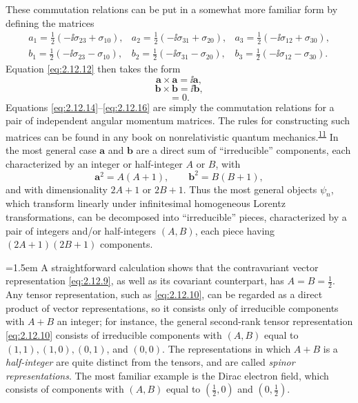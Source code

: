 These commutation relations can be put in a somewhat more familiar form by
defining the matrices
\begin{equation}
\begin{array}{lll}
  a_1=\frac12(-\ii\sigma_{23}+\sigma_{10}),&
  a_2=\frac12(-\ii\sigma_{31}+\sigma_{20}),&
  a_3=\frac12(-\ii\sigma_{12}+\sigma_{30}),\\[2mm]
  b_1=\frac12(-\ii\sigma_{23}-\sigma_{10}),&
  b_2=\frac12(-\ii\sigma_{31}-\sigma_{20}),&
  b_3=\frac12(-\ii\sigma_{12}-\sigma_{30}).
\end{array}
  \tag{2.12.13}\label{eq:2.12.13}
\end{equation}
Equation \eqref{eq:2.12.12} then takes the form
\begin{equation}
  \mathbf a\times\mathbf a=\ii\mathbf a ,
  \tag{2.12.14}\label{eq:2.12.14}
\end{equation}
\begin{equation}
  \mathbf b\times\mathbf b=\ii\mathbf b ,
  \tag{2.12.15}\label{eq:2.12.15}
\end{equation}
\begin{equation}
  [a_i,b_j]=0 .
  \tag{2.12.16}\label{eq:2.12.16}
\end{equation}
Equations \eqref{eq:2.12.14}--\eqref{eq:2.12.16} are simply the commutation
relations for a pair of independent angular momentum matrices. The rules for
constructing such matrices can be found in any book on nonrelativistic quantum
mechanics.\textsuperscript{\hyperref[ch2-ref-11]{11}} In the most general case
\(\mathbf a\) and \(\mathbf b\) are a direct sum of ``irreducible''
components, each characterized by an integer or half-integer \(A\) or \(B\),
with
\begin{equation}
  \mathbf a^2=A(A+1),\qquad
  \mathbf b^2=B(B+1),
  \tag{2.12.17}\label{eq:2.12.17}
\end{equation}
and with dimensionality \(2A+1\) or \(2B+1\). Thus the most general objects
\(\psi_n\), which transform linearly under infinitesimal homogeneous Lorentz
transformations, can be decomposed into ``irreducible'' pieces, characterized
by a pair of integers and/or half-integers \((A,B)\), each piece having
\((2A+1)(2B+1)\) components.

\begingroup
\emergencystretch=1.5em
A straightforward calculation shows that the contravariant vector
representation \eqref{eq:2.12.9}, as well as its covariant counterpart, has
\(A=B=\tfrac12\). Any tensor representation, such as
\eqref{eq:2.12.10}, can be regarded as a direct product of vector
representations, so it consists only of irreducible components with \(A+B\)
an integer; for instance, the general second-rank tensor representation
\eqref{eq:2.12.10} consists of irreducible components with \((A,B)\) equal
to \((1,1),(1,0),(0,1)\), and \((0,0)\). The representations in which
\(A+B\) is a \emph{half-integer} are quite distinct from the tensors, and are
called \emph{spinor representations}. The most familiar example is the Dirac
electron field, which consists of components with \((A,B)\) equal to
\((\tfrac12,0)\) and \((0,\tfrac12)\).
\par
\endgroup

